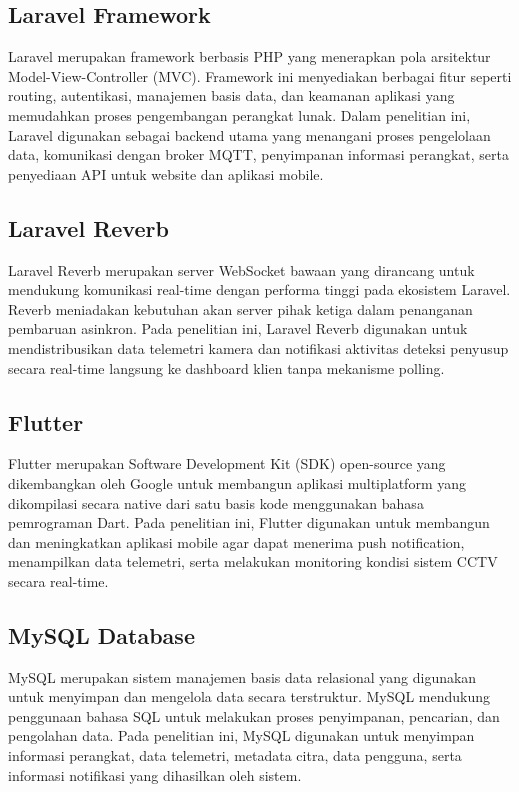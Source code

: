 \subsection{Laravel Framework}

Laravel merupakan framework berbasis PHP yang menerapkan pola arsitektur Model-View-Controller (MVC). Framework ini menyediakan berbagai fitur seperti routing, autentikasi, manajemen basis data, dan keamanan aplikasi yang memudahkan proses pengembangan perangkat lunak. Dalam penelitian ini, Laravel digunakan sebagai backend utama yang menangani proses pengelolaan data, komunikasi dengan broker MQTT, penyimpanan informasi perangkat, serta penyediaan API untuk website dan aplikasi mobile.

\subsection{Laravel Reverb}

Laravel Reverb merupakan server WebSocket bawaan yang dirancang untuk mendukung komunikasi real-time dengan performa tinggi pada ekosistem Laravel. Reverb meniadakan kebutuhan akan server pihak ketiga dalam penanganan pembaruan asinkron. Pada penelitian ini, Laravel Reverb digunakan untuk mendistribusikan data telemetri kamera dan notifikasi aktivitas deteksi penyusup secara real-time langsung ke dashboard klien tanpa mekanisme polling.

\subsection{Flutter}

Flutter merupakan Software Development Kit (SDK) open-source yang dikembangkan oleh Google untuk membangun aplikasi multiplatform yang dikompilasi secara native dari satu basis kode menggunakan bahasa pemrograman Dart. Pada penelitian ini, Flutter digunakan untuk membangun dan meningkatkan aplikasi mobile agar dapat menerima push notification, menampilkan data telemetri, serta melakukan monitoring kondisi sistem CCTV secara real-time.

\subsection{MySQL Database}

MySQL merupakan sistem manajemen basis data relasional yang digunakan untuk menyimpan dan mengelola data secara terstruktur. MySQL mendukung penggunaan bahasa SQL untuk melakukan proses penyimpanan, pencarian, dan pengolahan data. Pada penelitian ini, MySQL digunakan untuk menyimpan informasi perangkat, data telemetri, metadata citra, data pengguna, serta informasi notifikasi yang dihasilkan oleh sistem.

